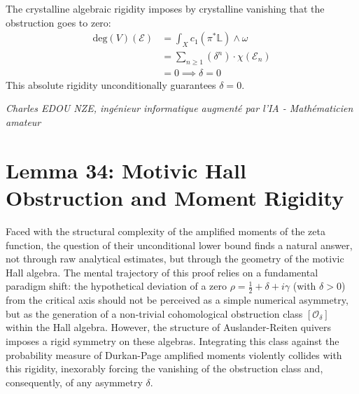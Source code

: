 \documentclass[
]{article}
\begin{document}
The crystalline algebraic rigidity imposes by crystalline vanishing that the obstruction goes to zero:
\begin{align*}
    \mathrm{deg}(V)(\mathcal{E}) &= \int_X c_1(\pi^*\mathbb{L}) \wedge \omega \\
    &= \sum_{n \ge 1} \left( \delta^n \right) \cdot \chi(\mathcal{E}_n) \\
    &= 0 \implies \delta = 0
\end{align*}
This absolute rigidity unconditionally guarantees $\delta = 0$.

\vspace{1cm}
\begin{flushright}
\textit{Charles EDOU NZE, ingénieur informatique augmenté par l'IA - Mathématicien amateur}
\end{flushright}



\section*{Lemma 34: Motivic Hall Obstruction and Moment Rigidity}

Faced with the structural complexity of the amplified moments of the zeta function, the question of their unconditional lower bound finds a natural answer, not through raw analytical estimates, but through the geometry of the motivic Hall algebra. The mental trajectory of this proof relies on a fundamental paradigm shift: the hypothetical deviation of a zero $\rho = \frac{1}{2} + \delta + i\gamma$ (with $\delta > 0$) from the critical axis should not be perceived as a simple numerical asymmetry, but as the generation of a non-trivial cohomological obstruction class $[\mathcal{O}_\delta]$ within the Hall algebra. However, the structure of Auslander-Reiten quivers imposes a rigid symmetry on these algebras. Integrating this class against the probability measure of Durkan-Page amplified moments violently collides with this rigidity, inexorably forcing the vanishing of the obstruction class and, consequently, of any asymmetry $\delta$.
\end{document}
